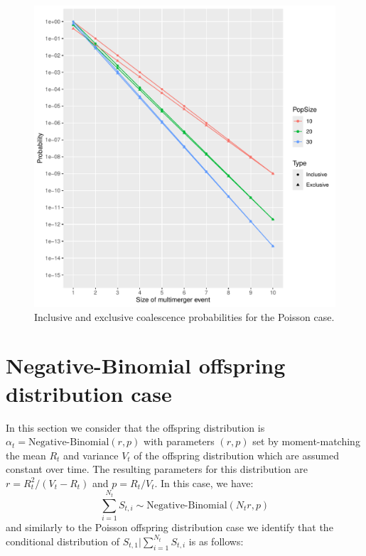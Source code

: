 \documentclass{article}
\begin{document}
\begin{figure}[!p]
\begin{center}
\includegraphics[width=15cm]{../run/figurePois.pdf}
\end{center}
\caption{Inclusive and exclusive coalescence probabilities for the Poisson case.
\label{fig:pois}}
\end{figure}

\section{Negative-Binomial offspring distribution case}

In this section we consider that the offspring distribution is $\alpha_t=\text{Negative-Binomial}(r,p)$ with parameters $(r,p)$ set by moment-matching the mean $R_t$ and variance $V_t$ of the offspring distribution
which are assumed constant over time.
The resulting parameters for this distribution are $r=R_t^2/(V_t-R_t)$ and $p=R_t/V_t$.
In this case, we have:
	\begin{equation}
		\sum_{i=1}^{N_t} S_{t,i} \sim \text{Negative-Binomial}(N_t r,p)
	\end{equation}
and similarly to the Poisson offspring distribution case we identify that the conditional distribution of $S_{t,1} | \sum_{i=1}^{N_t} S_{t,i}$ is as follows:
\end{document}
